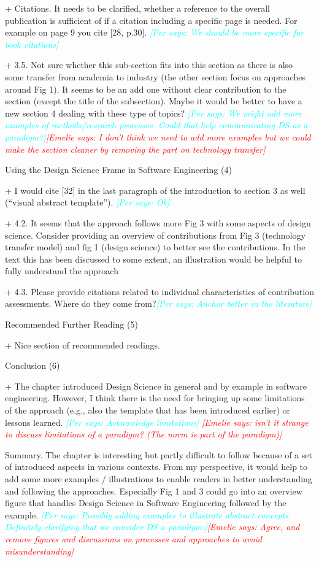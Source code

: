 \documentclass{article}
\newcommand{\emelie}[1]{\textcolor{red}{{\it [Emelie says: #1]}}}
\newcommand{\per}[1]{\textcolor{cyan}{{\it [Per says: #1]}}}
\newcommand{\emelie}[1]{}
\newcommand{\per}[1]{}
\begin{document}
+ Citations. It needs to be clarified, whether a reference to the overall publication is sufficient of if a citation including a specific page is needed. For example on page 9 you cite [28, p.30]. \per{We should be more specific for book citations}

+ 3.5. Not sure whether this sub-section fits into this section as there is also some transfer from academia to industry (the other section focus on approaches around Fig 1). It seems to be an add one without clear contribution to the section (except the title of the subsection). Maybe it would be better to have a new section 4 dealing with these type of topics? \per{We might add more examples of methods/research processes. Could that help communicating DS as a paradigm?}\emelie{I don't think we need to add more examples but we could make the section cleaner by removing the part on technology transfer}


Using the Design Science Frame in Software Engineering (4)

+ I would cite [32] in the last paragraph of the introduction to section 3 as well (“visual abstract template”). \per{Ok}

+ 4.2. It seems that the approach follows more Fig 3 with some aspects of design science. Consider providing an overview of contributions from Fig 3 (technology transfer model) and fig 1 (design science) to better see the contributions. In the text this has been discussed to some extent, an illustration would be helpful to fully understand the approach

+ 4.3. Please provide citations related to individual characteristics of contribution assessments. Where do they come from?\per{Anchor better in the literature}

Recommended Further Reading (5)

+ Nice section of recommended readings.

Conclusion (6)

+ The chapter introduced Design Science in general and by example in software engineering. However, I think there is the need for bringing up some limitations of the approach (e.g., also the template that has been introduced earlier) or lessons learned. \per{Acknowledge limitations} \emelie{isn't it strange to discuss limitations of a paradigm? (The norm is part of the paradigm)}

Summary. The chapter is interesting but partly difficult to follow because of a set of introduced aspects in various contexts. From my perspective, it would help to add some more examples / illustrations to enable readers in better understanding and following the approaches. Especially Fig 1 and 3 could go into an overview figure that handles Design Science in Software Engineering followed by the example. \per{Possibly adding examples to illustrate abstract concepts. Definitely clarifying that we consider DS a paradigm.}\emelie{Agree, and remove figures and discussions on processes and approaches to avoid misunderstanding}
\end{document}
